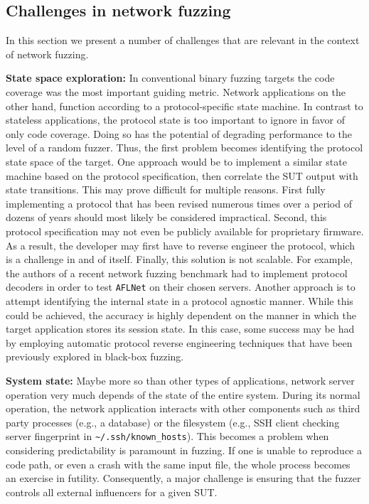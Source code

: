 \subsection{Challenges in network fuzzing}
\label{extend:netfuzz:challenges}

In this section we present a number of challenges that are relevant in the context of network fuzzing.

\textbf{State space exploration:} In conventional binary fuzzing targets the code coverage was the most important guiding metric. Network applications on the other hand, function according to a protocol-specific state machine. In contrast to stateless applications, the protocol state is too important to ignore in favor of only code coverage. Doing so has the potential of degrading performance to the level of a random fuzzer. Thus, the first problem becomes identifying the protocol state space of the target. One approach would be to implement a similar state machine based on the protocol specification, then correlate the SUT output with state transitions. This may prove difficult for multiple reasons. First fully implementing a protocol that has been revised numerous times over a period of dozens of years should most likely be considered impractical. Second, this protocol specification may not even be publicly available for proprietary firmware. As a result, the developer may first have to reverse engineer the protocol, which is a challenge in and of itself. Finally, this solution is not scalable. For example, the authors of a recent network fuzzing benchmark \cite{natella2021profuzzbench} had to implement protocol decoders in order to test \texttt{AFLNet} on their chosen servers. Another approach is to attempt identifying the internal state in a protocol agnostic manner. While this could be achieved, the accuracy is highly dependent on the manner in which the target application stores its session state. In this case, some success may be had by employing automatic protocol reverse engineering techniques \cite{gascon2015pulsar} that have been previously explored in black-box fuzzing.

\textbf{System state:} Maybe more so than other types of applications, network server operation very much depends of the state of the entire system. During its normal operation, the network application interacts with other components such as third party processes (e.g., a database) or the filesystem (e.g., SSH client checking server fingerprint in \texttt{\~{}/.ssh/known\_hosts}). This becomes a problem when considering predictability is paramount in fuzzing. If one is unable to reproduce a code path, or even a crash with the same input file, the whole process becomes an exercise in futility. Consequently, a major challenge is ensuring that the fuzzer controls all external influencers for a given SUT.


